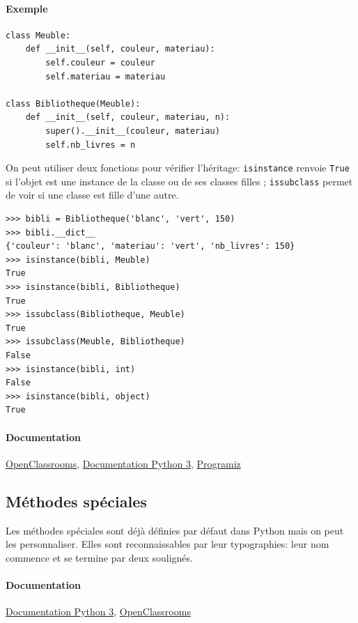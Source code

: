 \documentclass[a4paper, 10pt]{article}
\newcommand{\code}[1]{{\small\texttt{#1}}}
\begin{document}
\paragraph{Exemple}
\begin{verbatim}
class Meuble:
    def __init__(self, couleur, materiau):
        self.couleur = couleur
        self.materiau = materiau

class Bibliotheque(Meuble):
    def __init__(self, couleur, materiau, n):
        super().__init__(couleur, materiau)
        self.nb_livres = n
\end{verbatim}
On peut utiliser deux fonctions pour vérifier l'héritage: \code{isinstance} renvoie \code{True} si l'objet est une instance de la classe ou de ses classes filles ; \code{issubclass} permet de voir si une classe est fille d'une autre.

\begin{Verbatim}[frame = single, fontsize = \footnotesize]
>>> bibli = Bibliotheque('blanc', 'vert', 150)
>>> bibli.__dict__
{'couleur': 'blanc', 'materiau': 'vert', 'nb_livres': 150}
>>> isinstance(bibli, Meuble)
True
>>> isinstance(bibli, Bibliotheque)
True
>>> issubclass(Bibliotheque, Meuble)
True
>>> issubclass(Meuble, Bibliotheque)
False
>>> isinstance(bibli, int)
False
>>> isinstance(bibli, object)
True
\end{Verbatim}

\paragraph{Documentation} \href{https://openclassrooms.com/courses/apprenez-a-programmer-en-python/l-heritage-9}{OpenClassrooms}, \href{https://docs.python.org/fr/3/tutorial/classes.html?highlight=héritage#inheritance}{Documentation Python 3}, \href{https://www.programiz.com/python-programming/inheritance}{Programiz}
\subsection{Méthodes spéciales}
 Les méthodes spéciales sont déjà définies par défaut dans Python mais on peut les personnaliser. Elles sont reconnaissables par leur typographies: leur nom commence et se termine par deux soulignés.

\paragraph{Documentation} \href{https://docs.python.org/3/reference/datamodel.html#specialnames}{Documentation Python 3}, \href{https://openclassrooms.com/courses/apprenez-a-programmer-en-python/les-methodes-speciales-1}{OpenClassrooms}
\end{document}
